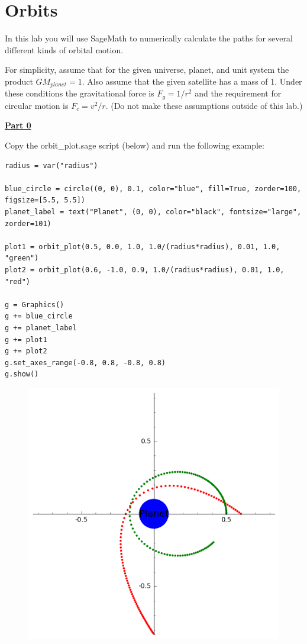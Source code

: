 \section{Orbits}

In this lab you will use SageMath to numerically calculate the paths for several different kinds of orbital motion.
\hfill \break

For simplicity, assume that for the given universe, planet, and unit system the product $GM_{planet} = 1$.
Also assume that the given satellite has a mass of 1.
Under these conditions the gravitational force is $F_g = 1/r^2$ and the requirement for circular motion is $F_c = v^2/r$.
(Do not make these assumptions outside of this lab.)
\hfill \break

\underline{\textbf{Part 0}} \par
Copy the orbit\_plot.sage script (below) and run the following example:
\begin{verbatim}
radius = var("radius")

blue_circle = circle((0, 0), 0.1, color="blue", fill=True, zorder=100, figsize=[5.5, 5.5])
planet_label = text("Planet", (0, 0), color="black", fontsize="large", zorder=101)

plot1 = orbit_plot(0.5, 0.0, 1.0, 1.0/(radius*radius), 0.01, 1.0, "green")
plot2 = orbit_plot(0.6, -1.0, 0.9, 1.0/(radius*radius), 0.01, 1.0, "red")

g = Graphics()
g += blue_circle
g += planet_label
g += plot1
g += plot2
g.set_axes_range(-0.8, 0.8, -0.8, 0.8)
g.show()
\end{verbatim}
%
\begin{figure}[H]
\includegraphics[scale=0.60]{figures/orbits/part0.png}
\end{figure}

